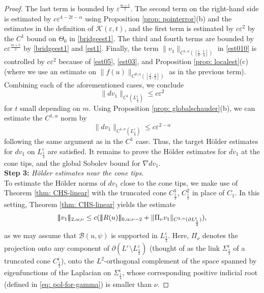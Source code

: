 \documentclass[11pt]{amsart}
\DeclarePairedDelimiter{\tnorm}{\vert\!\vert\!\vert}{\vert\!\vert\!\vert}
\theoremstyle{definition}
\theoremstyle{remark}
\begin{document}
\begin{proof}
    The last term is bounded by $\varepsilon^{\frac{m+5}{2}}$.
    The second term on the right-hand side is estimated by $c\varepsilon^{4-2t-\alpha}$ using Proposition \ref{prop: pointerror}(b) and the estimates in the definition of $\mathscr{K}(\varepsilon,t)$, and the first term is estimated by $c\varepsilon^{2}$ by the $C^1$ bound on $\Theta_0$ in \eqref{bridgeest1}.
    The third and fourth terms are bounded by $c\varepsilon^{\frac{m+5}{2}}$ by \eqref{bridgeest1} and \eqref{est1}. 
    Finally, the term $\lVert v_1\rVert_{C^{1,\alpha}([\frac{1}{8}, \frac{1}{4}])} $ in \eqref{est010} is controlled by $c\varepsilon^{2}$ because of \eqref{est05}, \eqref{est03}, and Proposition \ref{prop: localest}(c) (where we use an estimate on $\lVert f(u)\rVert_{C^{0,\alpha}([\frac{1}{4},\frac{1}{2}])}$ as in the previous term). Combining each of the aforementioned cases, we conclude
    \begin{equation}
        \|dv_1\|_{C^{1}(L_{\frac{1}{4}}^\varepsilon)} \leq c \varepsilon^{2 } \label{1alpha}
    \end{equation}
    for $t$ small depending on $m$.
    Using Proposition \ref{prop: globalschauder}(b), we can estimate the $C^{1,\alpha}$ norm by 
    \begin{equation}\label{eq: upper-setimate-dv1}
        \| dv_1\|_{C^{1,\alpha}(L_{\frac{1}{4}}^\varepsilon)} \leq c\varepsilon^{2-\alpha}
    \end{equation}
    following the same argument as in the $C^1$ case. Thus, the target H\"older estimates for $dv_1$ on $L_{\frac{1}{4}}^\varepsilon$ are satisfied. It remains to prove the H\"older estimates for $dv_1$ at the cone tips, and the global Sobolev bound for $\nabla dv_1$. \\

    \noindent
    \textbf{Step 3:} \emph{H\"older estimates near the cone tips}. \\

    To estimate the H\"older norms of $dv_1$ close to the cone tips, we make use of Theorem \ref{thm: CHS-linear} with the truncated cone $C^1_\frac{1}{2}$, $C^2_\frac{1}{2}$ in place of $C_1$. In this setting, Theorem \ref{thm: CHS-linear} yields the estimate
    \begin{align*}
        \tnorm {v_1}_{2,\alpha;\nu}\leq c(\tnorm{R(u)}_{0,\alpha;\nu-2}+\lVert \Pi_\nu v_1\rVert_{C^{2,\alpha}(\partial L^\varepsilon_\frac{1}{2})}),
    \end{align*}
    as we may assume that $\mathcal{B}(u,\psi)$ is supported in $L^\varepsilon_\frac{3}{4}$. Here, $\Pi_\nu$ denotes the projection onto any component of $\partial(L^\varepsilon \setminus  L^\varepsilon_\frac{1}{2})$ (thought of as the link $\Sigma^i_\frac{1}{2}$ of a truncated cone $C^i_\frac{1}{2}$), onto the $L^2$-orthogonal complement of the space spanned by eigenfunctions of the Laplacian on $\Sigma_\frac{1}{4}^i$, whose corresponding positive indicial root (defined in \eqref{eq: pol-for-gamma}) is smaller than $\nu$.


\end{proof}
\end{document}
